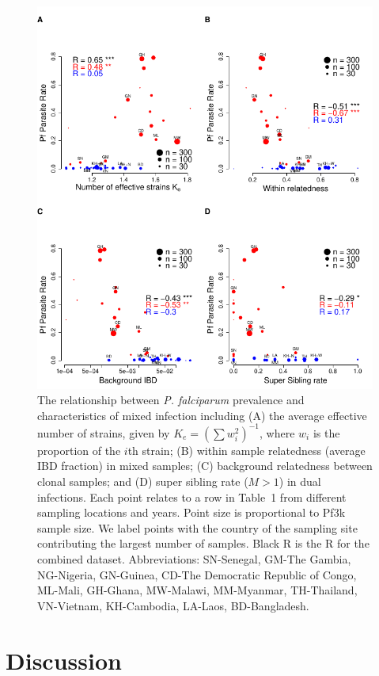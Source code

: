 \documentclass[9pt,lineno]{elife}
\begin{document}
\begin{figure}[htp]
  \centering{}
  \includegraphics[width=\textwidth]{Fig7.pdf}
  \caption{The relationship between {\it P. falciparum} prevalence and characteristics of mixed infection including (A) the average effective number of strains, given by $K_e = (\sum w_i^2)^{-1}$, where $w_i$ is the proportion of the $i$th strain; (B) within sample relatedness (average IBD fraction) in mixed samples; (C) background relatedness between clonal samples; and (D) super sibling rate ($M>1$) in dual infections. Each point relates to a row in Table~1 from different sampling locations and years. Point size is proportional to Pf3k sample size. We label points with the country of the sampling site contributing the largest number of samples. Black R is the R for the combined dataset. Abbreviations: SN-Senegal, GM-The Gambia, NG-Nigeria, GN-Guinea, CD-The Democratic Republic of Congo, ML-Mali, GH-Ghana, MW-Malawi, MM-Myanmar, TH-Thailand, VN-Vietnam, KH-Cambodia, LA-Laos, BD-Bangladesh.}
  \label{fig:model}
\end{figure}



\section{Discussion}
\end{document}
